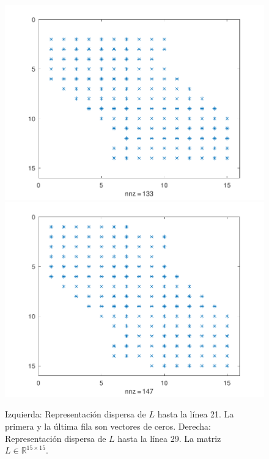 \begin{problem}
\begin{itemize}
            \begin{figure}[ht!]
                  \centering
                  \includegraphics[width=.39\paperwidth]{../examples/octave/elliptic1Dsparsebefore.pdf}
                  \includegraphics[width=.39\paperwidth]{../examples/octave/elliptic1Dsparseafter.pdf}
                  \caption{Izquierda: Representación dispersa de $L$ hasta la línea
                        21.
                        La primera y la última fila son vectores de ceros.
                        Derecha: Representación dispersa de $L$ hasta la línea 29.
                        La matriz $L\in\mathbb{R}^{15\times 15}$.}
            \end{figure}


\end{itemize}
\end{problem}
